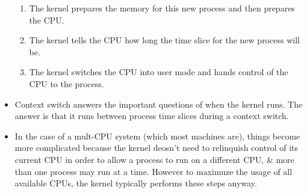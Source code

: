 \documentclass{article}
\begin{document}
\begin{itemize}
\begin{enumerate}
				\item The kernel prepares the memory for this new process and then prepares the CPU.
				\item The kernel tells the CPU how long the time slice for the new process will be.
				\item The kernel switches the CPU into user mode and hands control of the CPU to the process.
			\end{enumerate}
		\item Context switch answers the important questions of when the kernel runs. The answer is that it runs between process time slices during a context switch.
		\item In the case of a mult-CPU system (which most machines are), things become more complicated because the kernel deosn't need to relinquish control of its current CPU in order to allow a process to run on a different CPU, \& more than one process may run at a time. However to maximuze the usage of all available CPUs, the kernel typically performs these steps anyway.
	\end{itemize}	
\end{document}
